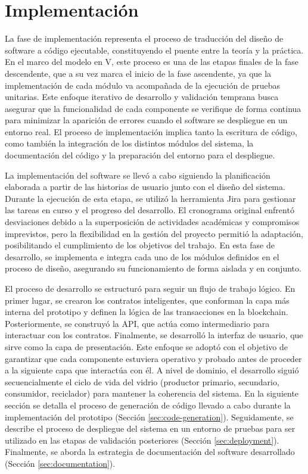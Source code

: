 \chapter[Implementación]{Implementación}
\label{cp:implementation}

\parindent0pt

La fase de implementación representa el proceso de traducción del diseño de software a código ejecutable, constituyendo el puente entre la teoría y la práctica. En el marco del modelo en V, este proceso es una de las etapas finales de la fase descendente, que a su vez marca el inicio de la fase ascendente, ya que la implementación de cada módulo va acompañada de la ejecución de pruebas unitarias. Este enfoque iterativo de desarrollo y validación temprana busca asegurar que la funcionalidad de cada componente se verifique de forma continua para minimizar la aparición de errores cuando el software se despliegue en un entorno real. El proceso de implementación implica tanto la escritura de código, como también la integración de los distintos módulos del sistema, la documentación del código y la preparación del entorno para el despliegue.

La implementación del software se llevó a cabo siguiendo la planificación elaborada a partir de las historias de usuario junto con el diseño del sistema. Durante la ejecución de esta etapa, se utilizó la herramienta Jira para gestionar las tareas en curso y el progreso del desarrollo. El cronograma original enfrentó desviaciones debido a la superposición de actividades académicas y compromisos imprevistos, pero la flexibilidad en la gestión del proyecto permitió la adaptación, posibilitando el cumplimiento de los objetivos del trabajo. En esta fase de desarrollo, se implementa e integra cada uno de los módulos definidos en el proceso de diseño, asegurando su funcionamiento de forma aislada y en conjunto.

El proceso de desarrollo se estructuró para seguir un flujo de trabajo lógico. En primer lugar, se crearon los contratos inteligentes, que conforman la capa más interna del prototipo y definen la lógica de las transacciones en la blockchain. Posteriormente, se construyó la API, que actúa como intermediario para interactuar con los contratos. Finalmente, se desarrolló la interfaz de usuario, que sirve como la capa de presentación. Este enfoque se adoptó con el objetivo de garantizar que cada componente estuviera operativo y probado antes de proceder a la siguiente capa que interactúa con él. A nivel de dominio, el desarrollo siguió secuencialmente el ciclo de vida del vidrio (productor primario, secundario, consumidor, reciclador) para mantener la coherencia del sistema. En la siguiente sección se detalla el proceso de generación de código llevado a cabo durante la implementación del prototipo (Sección \ref{sec:code-generation}). Seguidamente, se describe el proceso de despliegue del sistema en un entorno de pruebas para ser utilizado en las etapas de validación posteriores (Sección \ref{sec:deployment}). Finalmente, se aborda la estrategia de documentación del software desarrollado (Sección \ref{sec:documentation}).

